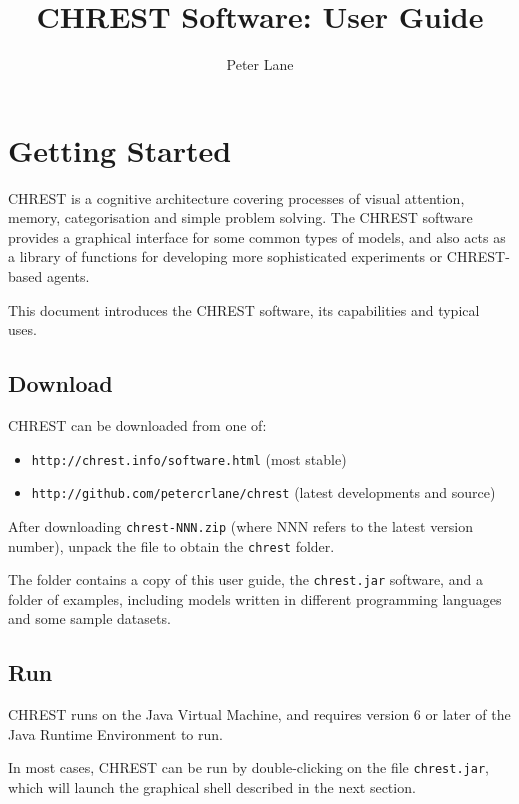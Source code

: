 \documentclass{article}
\title{CHREST Software: User Guide}
\author{Peter Lane}
\begin{document}
\maketitle
\tableofcontents

\newpage
\section{Getting Started}

CHREST is a cognitive architecture covering processes of visual attention,
memory, categorisation and simple problem solving.  The CHREST software
provides a graphical interface for some common types of models, and also acts
as a library of functions for developing more sophisticated experiments or
CHREST-based agents.

This document introduces the CHREST software, its capabilities and typical 
uses. 

\subsection{Download}

CHREST can be downloaded from one of:

\begin{itemize}
\item {\tt http://chrest.info/software.html}  (most stable)
\item {\tt http://github.com/petercrlane/chrest} (latest developments and source)
\end{itemize}

\noindent After downloading {\tt chrest-NNN.zip} (where NNN refers to the
latest version number), unpack the file to obtain the {\tt chrest} folder.

The folder contains a copy of this user guide, the {\tt chrest.jar} software, 
and a folder of examples, including models written in different programming 
languages and some sample datasets.

\subsection{Run}

CHREST runs on the Java Virtual Machine, and requires version 6 or later of the 
Java Runtime Environment to run.

In most cases, CHREST can be run by double-clicking on the file {\tt chrest.jar}, 
which will launch the graphical shell described in the next section.
\end{document}
